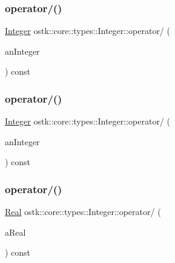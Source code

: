 \subsubsection{\texorpdfstring{operator/()}{operator/()}\hspace{0.1cm}{\footnotesize\ttfamily [1/3]}}
{\footnotesize\ttfamily \hyperlink{classostk_1_1core_1_1types_1_1_integer}{Integer} ostk\+::core\+::types\+::\+Integer\+::operator/ (\begin{DoxyParamCaption}\item[{const \hyperlink{classostk_1_1core_1_1types_1_1_integer}{Integer} \&}]{an\+Integer }\end{DoxyParamCaption}) const}

\mbox{\label{classostk_1_1core_1_1types_1_1_integer_a5ba11db72a96da2ce6e97f6c695c3f8b}} 
\subsubsection{\texorpdfstring{operator/()}{operator/()}\hspace{0.1cm}{\footnotesize\ttfamily [2/3]}}
{\footnotesize\ttfamily \hyperlink{classostk_1_1core_1_1types_1_1_integer}{Integer} ostk\+::core\+::types\+::\+Integer\+::operator/ (\begin{DoxyParamCaption}\item[{const \hyperlink{classostk_1_1core_1_1types_1_1_integer_a76a5f41f78659f116eafaf26cecc3244}{Integer\+::\+Value\+Type} \&}]{an\+Integer }\end{DoxyParamCaption}) const}

\mbox{\label{classostk_1_1core_1_1types_1_1_integer_aa59788cd255ad5ffd307853a5737460c}} 
\subsubsection{\texorpdfstring{operator/()}{operator/()}\hspace{0.1cm}{\footnotesize\ttfamily [3/3]}}
{\footnotesize\ttfamily \hyperlink{classostk_1_1core_1_1types_1_1_real}{Real} ostk\+::core\+::types\+::\+Integer\+::operator/ (\begin{DoxyParamCaption}\item[{const \hyperlink{classostk_1_1core_1_1types_1_1_real}{Real} \&}]{a\+Real }\end{DoxyParamCaption}) const}


